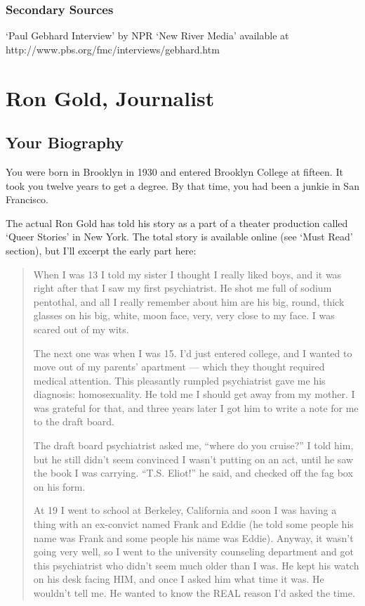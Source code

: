 \begin{refsection}
\subsection{Secondary Sources}
\label{secondarysources}

`Paul Gebhard Interview' by NPR `New River Media' available at http:\slash \slash www.pbs.org\slash fmc\slash interviews\slash gebhard.htm

\chapter{Ron Gold, Journalist}
\label{rongoldjournalist}

\section{Your Biography}
\label{yourbiography}

You were born in Brooklyn in 1930 and entered Brooklyn College at fifteen. It took you twelve years to get a degree. By that time, you had been a junkie in San Francisco.

The actual Ron Gold has told his story as a part of a theater production called `Queer Stories' in New York. The total story is available online (see `Must Read' section), but I'll excerpt the early part here:

\begin{quote}

When I was 13 I told my sister I thought I really liked boys, and it was right after that I saw my first psychiatrist. He shot me full of sodium pentothal, and all I really remember about him are his big, round, thick glasses on his big, white, moon face, very, very close to my face. I was scared out of my wits.

The next one was when I was 15. I'd just entered college, and I wanted to move out of my parents' apartment — which they thought required medical attention. This pleasantly rumpled psychiatrist gave me his diagnosis: homosexuality. He told me I should get away from my mother. I was grateful for that, and three years later I got him to write a note for me to the draft board.

The draft board psychiatrist asked me, ``where do you cruise?'' I told him, but he still didn't seem convinced I wasn't putting on an act, until he saw the book I was carrying. ``T.S. Eliot!'' he said, and checked off the fag box on his form.

At 19 I went to school at Berkeley, California and soon I was having a thing with an ex-convict named Frank and Eddie (he told some people his name was Frank and some people his name was Eddie). Anyway, it wasn't going very well, so I went to the university counseling department and got this psychiatrist who didn't seem much older than I was. He kept his watch on his desk facing HIM, and once I asked him what time it was. He wouldn't tell me. He wanted to know the REAL reason I'd asked the time.


\end{quote}
\end{refsection}
